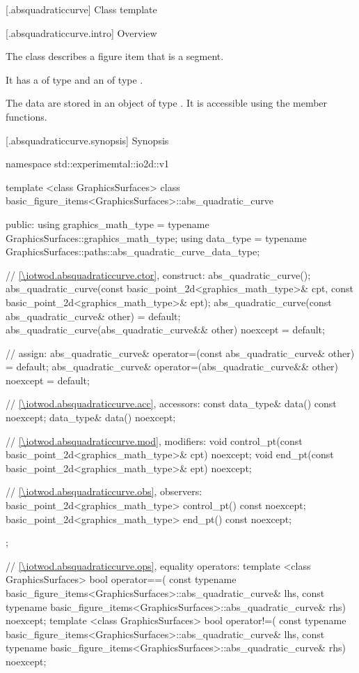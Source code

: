  [\iotwod.absquadraticcurve] {Class template }

 [\iotwod.absquadraticcurve.intro] {Overview}

\pnum
{}%
The class  describes a figure item that is a segment.

\pnum
It has a  of type  and an  of type .

\pnum
The data are stored in an object of type . It is accessible using the  member functions.

 [\iotwod.absquadraticcurve.synopsis] {Synopsis}
\begin{codeblock}
namespace std::experimemtal::io2d::v1 {
  template <class GraphicsSurfaces>
  class basic_figure_items<GraphicsSurfaces>::abs_quadratic_curve {
  public:
    using graphics_math_type = typename GraphicsSurfaces::graphics_math_type;
    using data_type =
      typename GraphicsSurfaces::paths::abs_quadratic_curve_data_type;

    // \ref{\iotwod.absquadraticcurve.ctor}, construct:
    abs_quadratic_curve();
    abs_quadratic_curve(const basic_point_2d<graphics_math_type>& cpt,
      const basic_point_2d<graphics_math_type>& ept);
    abs_quadratic_curve(const abs_quadratic_curve& other) = default;
    abs_quadratic_curve(abs_quadratic_curve&& other) noexcept = default;

    // assign:
    abs_quadratic_curve& operator=(const abs_quadratic_curve& other) = default;
    abs_quadratic_curve& operator=(abs_quadratic_curve&& other) noexcept = default;

    // \ref{\iotwod.absquadraticcurve.acc}, accessors:
    const data_type& data() const noexcept;
    data_type& data() noexcept;

    // \ref{\iotwod.absquadraticcurve.mod}, modifiers:
    void control_pt(const basic_point_2d<graphics_math_type>& cpt) noexcept;
    void end_pt(const basic_point_2d<graphics_math_type>& ept) noexcept;

    // \ref{\iotwod.absquadraticcurve.obs}, observers:
    basic_point_2d<graphics_math_type> control_pt() const noexcept;
    basic_point_2d<graphics_math_type> end_pt() const noexcept;
  };

  // \ref{\iotwod.absquadraticcurve.ops}, equality operators:
  template <class GraphicsSurfaces>
  bool operator==(
    const typename basic_figure_items<GraphicsSurfaces>::abs_quadratic_curve& lhs,
    const typename basic_figure_items<GraphicsSurfaces>::abs_quadratic_curve& rhs) 
    noexcept;  
  template <class GraphicsSurfaces>
  bool operator!=(
    const typename basic_figure_items<GraphicsSurfaces>::abs_quadratic_curve& lhs,
    const typename basic_figure_items<GraphicsSurfaces>::abs_quadratic_curve& rhs) 
    noexcept;  
}
\end{codeblock}

